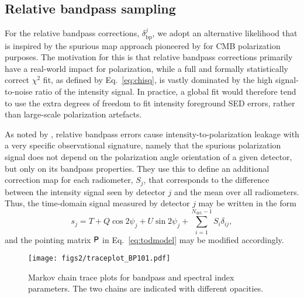 \documentclass[twocolumn]{aa}
\renewcommand{\P}[0]{\tens{P}}
\newcommand{\?}[1]{\textcolor{red}{{\bf [#1]}}}
\begin{document}
\subsection{Relative bandpass sampling}

For the relative bandpass corrections, $\delta_{\mathrm{bp}}^j$, we adopt an
alternative likelihood that is inspired by the spurious map approach pioneered
by \citet{page2007} for CMB polarization purposes. The motivation for this is
that relative bandpass corrections primarily have a real-world impact for
polarization, while a full and formally statistically correct $\chi^2$ fit, as
defined by Eq.~\eqref{eq:chisq}, is vastly dominated by the high signal-to-noise
ratio of the intensity signal. In practice, a global fit would therefore tend to
use the extra degrees of freedom to fit intensity foreground SED errors, rather
than large-scale polarization artefacts. 


As noted by \citet{page2007}, relative bandpass errors cause
intensity-to-polarization leakage with a very specific observational
signature, namely that the spurious polarization signal does not depend on the
polarization angle orientation of a given detector, but only on its
bandpass properties. They use this to define an additional correction
map for each radiometer, $S_j$, that corresponds to the difference
between the intensity signal seen by detector $j$ and the mean over
all radiometers. Thus, the time-domain signal measured by detector $j$
may be written in the form
\begin{equation}
    s_{j} = T + Q\cos2\psi_j + U\sin2\psi_j +
    \sum_{i=1}^{N_{\mathrm{det}}-1}S_i \delta_{ij},
\end{equation}
and the pointing matrix $\P$ in Eq.~\eqref{eq:todmodel} may be modified
accordingly.

  \begin{figure}[t] %
    \center
    \texttt{[image: figs2/traceplot\_BP101.pdf]}
    \caption{Markov chain trace plots for bandpass and spectral index parameters. The two chains are indicated with different opacities.}
    \label{fig:traceplot}
  \end{figure}
  
\end{document}
